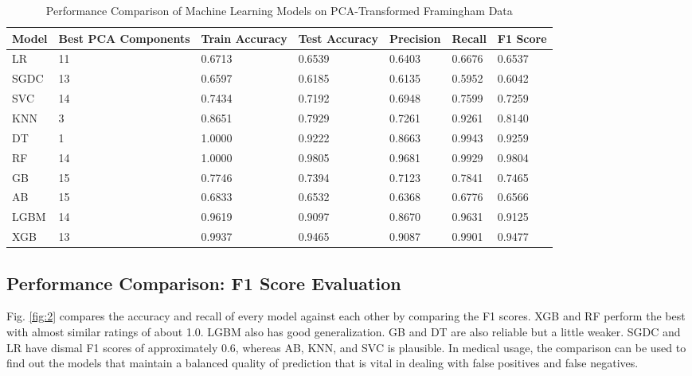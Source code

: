 \documentclass[conference]{IEEEtran}
\begin{document}
\begin{table}[t]
\centering
\caption{Performance Comparison of Machine Learning Models on PCA-Transformed Framingham Data}
\label{tab:model_performance}
\renewcommand{\arraystretch}{1.3}
\begin{tabular}{C{3cm} C{2cm} C{2.2cm} C{2.2cm} C{1.29cm} C{1.29cm} C{1.29cm}}
\toprule
\textbf{Model} & \textbf{Best PCA Components} & \textbf{Train Accuracy} & \textbf{Test Accuracy} & \textbf{Precision} & \textbf{Recall} & \textbf{F1 Score} \\
\midrule
LR     & 11 & 0.6713 & 0.6539 & 0.6403 & 0.6676 & 0.6537 \\
SGDC          & 13 & 0.6597 & 0.6185 & 0.6135 & 0.5952 & 0.6042 \\
SVC                     & 14 & 0.7434 & 0.7192 & 0.6948 & 0.7599 & 0.7259 \\
KNN     & 3  & 0.8651 & 0.7929 & 0.7261 & 0.9261 & 0.8140 \\
DT           & 1  & 1.0000 & 0.9222 & 0.8663 & 0.9943 & 0.9259 \\
RF          & 14 & 1.0000 & 0.9805 & 0.9681 & 0.9929 & 0.9804 \\
GB       & 15 & 0.7746 & 0.7394 & 0.7123 & 0.7841 & 0.7465 \\
AB                & 15 & 0.6833 & 0.6532 & 0.6368 & 0.6776 & 0.6566 \\
LGBM                & 14 & 0.9619 & 0.9097 & 0.8670 & 0.9631 & 0.9125 \\
XGB                 & 13 & 0.9937 & 0.9465 & 0.9087 & 0.9901 & 0.9477 \\
\bottomrule
\end{tabular}
\end{table}

\subsection{\textbf{Performance Comparison: F1 Score Evaluation}}



Fig. \ref{fig:2} compares the accuracy and recall of every model against each other by comparing the F1 scores. XGB and RF perform the best with almost similar ratings of about 1.0. LGBM also has good generalization. GB and DT are also reliable but a little weaker. SGDC and LR have dismal F1 scores of approximately 0.6, whereas AB, KNN, and SVC is plausible. In medical usage, the comparison can be used to find out the models that maintain a balanced quality of prediction that is vital in dealing with false positives and false negatives.
\end{document}

